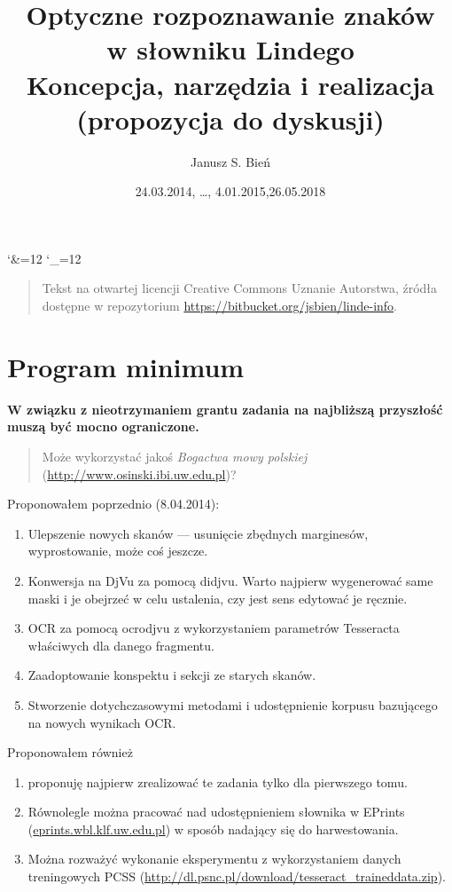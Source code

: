 \documentclass[12]{mwart}
\title{Optyczne rozpoznawanie znaków\\ w słowniku Lindego\\
Koncepcja, narzędzia i realizacja\\(propozycja do dyskusji)}
\author{Janusz S. Bień}
\date{24.03.2014, \ldots, 4.01.2015,26.05.2018}
\begin{document}
\maketitle

\catcode`\&=12
\catcode`\_=12

\begin{quote}
  Tekst na otwartej licencji Creative Commons Uznanie Autorstwa,
  źródła dostępne w repozytorium
  \url{https://bitbucket.org/jsbien/linde-info}.
\end{quote}

\section{Program minimum}
\label{sec:program-minimum}

  \textbf{W związku z nieotrzymaniem grantu zadania na najbliższą przyszłość
  muszą być mocno ograniczone.}

\begin{quote}
  Może wykorzystać jakoś \textit{Bogactwa mowy polskiej}
  (\url{http://www.osinski.ibi.uw.edu.pl})?
\end{quote}

Proponowałem poprzednio (8.04.2014):
\begin{enumerate}
\item \label{skany}Ulepszenie nowych skanów --- usunięcie zbędnych marginesów,
  wyprostowanie, może coś jeszcze.
\item Konwersja na DjVu za pomocą \textsf{didjvu}. Warto najpierw
  wygenerować same maski i je obejrzeć w celu ustalenia, czy jest sens
  edytować je ręcznie.
\item OCR za pomocą \textsf{ocrodjvu} z wykorzystaniem parametrów
  Tesseracta właściwych dla danego fragmentu. 
\item Zaadoptowanie konspektu i sekcji ze starych skanów.
\item Stworzenie dotychczasowymi metodami i udostępnienie korpusu
  bazującego na nowych wynikach OCR.
\end{enumerate}

Proponowałem również
\begin{enumerate}[resume]
\item \relax [\ldots] proponuję
najpierw zrealizować te zadania tylko dla pierwszego tomu.
\item Równolegle można pracować nad udostępnieniem słownika w EPrints
(\url{eprints.wbl.klf.uw.edu.pl}) w sposób nadający się do
harwestowania.
\item \label{PCSS} Można rozważyć wykonanie eksperymentu z wykorzystaniem danych
treningowych PCSS
(\url{http://dl.psnc.pl/download/tesseract_traineddata.zip}).
\end{enumerate}
\end{document}
